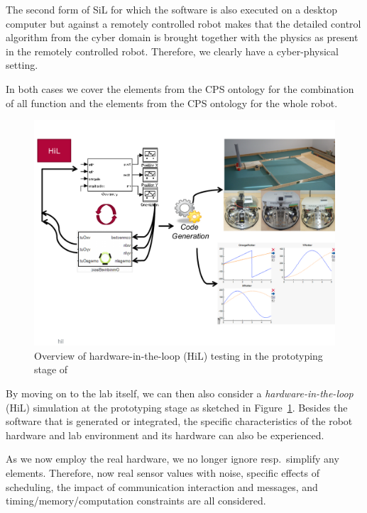 The second form of SiL for which the software is also executed on a desktop computer but against a remotely controlled robot makes that the detailed control algorithm from the cyber domain is brought together with the physics as present in the remotely controlled robot. Therefore, we clearly have a cyber-physical setting. 

In both cases we cover the elements \CPSCyberPart from the CPS ontology for the combination of all function and the elements \CPSPhysicalPart from the CPS ontology for the whole robot.


\begin{figure}[!htb]
\centering
\includegraphics[scale=0.33]{figures/hil.pdf}
\caption{Overview of hardware-in-the-loop (HiL) testing in the prototyping stage of \cite{Broekman&Notenboom2003}}
\label{fig:hil}
\end{figure}


%
By moving on to the lab itself, we can then also consider a \emph{hardware-in-the-loop} (HiL) simulation at the prototyping stage as sketched in Figure~\ref{fig:hil}. Besides the software that is generated or integrated, the specific characteristics of the robot hardware and lab environment and its hardware can also be experienced.

As we now employ the real hardware, we no longer ignore resp.~simplify any elements. Therefore, now real sensor values with noise, specific effects of scheduling, the impact of communication interaction and messages, and timing/memory/computation constraints are all considered.

